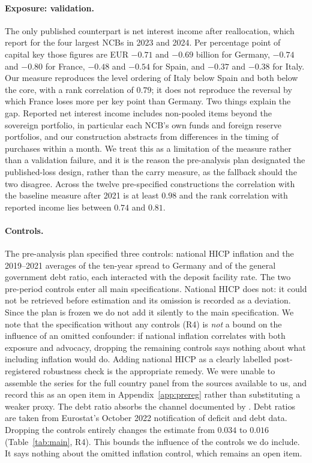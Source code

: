 \documentclass[11pt]{article}
\theoremstyle{plain}
\begin{document}
\paragraph{Exposure: validation.}
The only published counterpart is net interest income after reallocation, which \citet{arrata2026} report for the four largest NCBs in 2023 and 2024. Per percentage point of capital key those figures are EUR $-0.71$ and $-0.69$ billion for Germany, $-0.74$ and $-0.80$ for France, $-0.48$ and $-0.54$ for Spain, and $-0.37$ and $-0.38$ for Italy. Our measure reproduces the level ordering of Italy below Spain and both below the core, with a rank correlation of $0.79$; it does not reproduce the reversal by which France loses more per key point than Germany. Two things explain the gap. Reported net interest income includes non-pooled items beyond the sovereign portfolio, in particular each NCB's own funds and foreign reserve portfolios, and our construction abstracts from differences in the timing of purchases within a month. We treat this as a limitation of the measure rather than a validation failure, and it is the reason the pre-analysis plan designated the published-loss design, rather than the carry measure, as the fallback should the two disagree. Across the twelve pre-specified constructions the correlation with the baseline measure after 2021 is at least $0.98$ and the rank correlation with reported income lies between $0.74$ and $0.81$.

\paragraph{Controls.}
The pre-analysis plan specified three controls: national HICP inflation and the 2019--2021 averages of the ten-year spread to Germany and of the general government debt ratio, each interacted with the deposit facility rate. The two pre-period controls enter all main specifications. National HICP does not: it could not be retrieved before estimation and its omission is recorded as a deviation. Since the plan is frozen we do not add it silently to the main specification. We note that the specification without any controls (R4) is \emph{not} a bound on the influence of an omitted confounder: if national inflation correlates with both exposure and advocacy, dropping the remaining controls says nothing about what including inflation would do. Adding national HICP as a clearly labelled post-registered robustness check is the appropriate remedy. We were unable to assemble the series for the full country panel from the sources available to us, and record this as an open item in Appendix~\ref{app:prereg} rather than substituting a weaker proxy. The debt ratio absorbs the channel documented by \citet{heinemann2026}. Debt ratios are taken from Eurostat's October 2022 notification of deficit and debt data. Dropping the controls entirely changes the estimate from $0.034$ to $0.016$ (Table~\ref{tab:main}, R4). This bounds the influence of the controls we do include. It says nothing about the omitted inflation control, which remains an open item.
\end{document}
